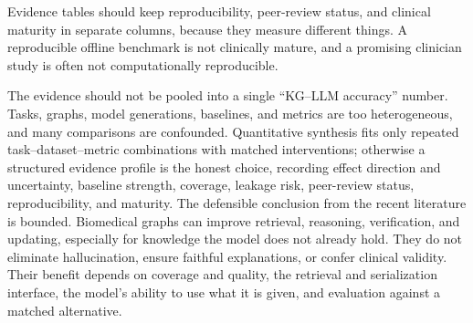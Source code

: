 Evidence tables should keep reproducibility, peer-review status, and clinical maturity in separate columns, because they measure different things. A reproducible offline benchmark is not clinically mature, and a promising clinician study is often not computationally reproducible.

The evidence should not be pooled into a single ``KG--LLM accuracy'' number. Tasks, graphs, model generations, baselines, and metrics are too heterogeneous, and many comparisons are confounded. Quantitative synthesis fits only repeated task--dataset--metric combinations with matched interventions; otherwise a structured evidence profile is the honest choice, recording effect direction and uncertainty, baseline strength, coverage, leakage risk, peer-review status, reproducibility, and maturity. The defensible conclusion from the recent literature is bounded. Biomedical graphs can improve retrieval, reasoning, verification, and updating, especially for knowledge the model does not already hold. They do not eliminate hallucination, ensure faithful explanations, or confer clinical validity. Their benefit depends on coverage and quality, the retrieval and serialization interface, the model's ability to use what it is given, and evaluation against a matched alternative.
